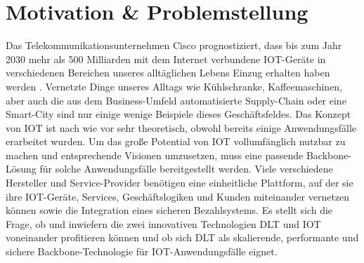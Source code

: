 %
%
\section{Motivation \& Problemstellung}
\label{sec:intro:motivation}
Das Telekommunikationsunternehmen Cisco prognostiziert, dass bis zum Jahr 2030 mehr als 500 Milliarden mit dem Internet verbundene \ac{IOT}-Geräte in verschiedenen Bereichen unseres alltäglichen Lebens Einzug erhalten haben werden \cite{cisco2016}. Vernetzte Dinge unseres Alltags wie Kühlschranke, Kaffeemaschinen, aber auch die aus dem Business-Umfeld automatisierte Supply-Chain oder eine Smart-City sind nur einige wenige Beispiele dieses Geschäftsfeldes. Das Konzept von \ac{IOT} ist nach wie vor sehr theoretisch, obwohl bereits einige Anwendungsfälle erarbeitet wurden. Um das große Potential von \ac{IOT} vollumfänglich nutzbar zu machen und entsprechende Visionen umzusetzen, muss eine passende Backbone-Lösung für solche Anwendungsfälle bereitgestellt werden. Viele verschiedene Hersteller und Service-Provider benötigen eine einheitliche Plattform, auf der sie ihre \ac{IOT}-Geräte, Services, Geschäftslogiken und Kunden miteinander vernetzen können sowie die Integration eines sicheren Bezahlsystems. Es stellt sich die Frage, ob und inwiefern die zwei innovativen Technologien \ac{DLT} und \ac{IOT} voneinander profitieren können und ob sich \ac{DLT} als skalierende, performante und sichere Backbone-Technologie für \ac{IOT}-Anwendungsfälle eignet.

%
%
